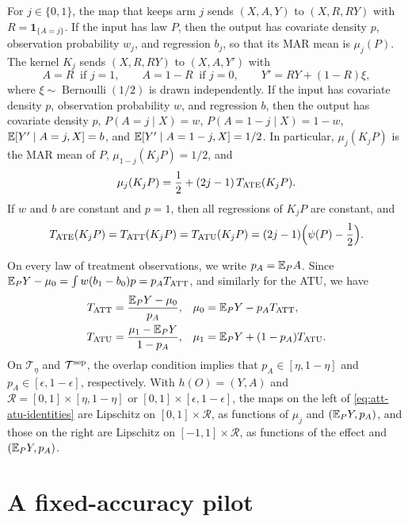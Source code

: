 For $j\in\{0,1\}$, the map that keeps arm $j$ sends $(X,A,Y)$ to
$(X,R,RY)$ with $R=\mathbf 1_{\{A=j\}}$. If the input has law $P$, then
the output has covariate density $p$, observation probability $w_j$,
and regression $b_j$, so that its MAR mean is $\mu_j(P)$. The
kernel $K_j$ sends $(X,R,RY)$ to $(X,A,Y')$ with
\[
 A=R\ \text{ if }j=1,\qquad A=1-R\ \text{ if }j=0,\qquad
 Y'=RY+(1-R)\xi,
\]
where $\xi\sim\operatorname{Bernoulli}(1/2)$ is drawn independently. If
the input has covariate density $p$, observation probability $w$, and
regression $b$, then the output has covariate density $p$,
$P(A=j\mid X)=w$, $P(A=1-j\mid X)=1-w$, $\mathbb E[Y'\mid A=j,X]=b$, and
$\mathbb E[Y'\mid A=1-j,X]=1/2$. In particular, $\mu_j(K_jP)$ is the MAR mean
of $P$, $\mu_{1-j}(K_jP)=1/2$, and
\begin{equation}\label{eq:kernel-ate}
 \mu_j(K_jP)=\frac12+(2j-1)\,T_{\rm ATE}(K_jP).
\end{equation}
If $w$ and $b$ are constant and $p=1$, then all regressions of
$K_jP$ are constant, and
\begin{equation}\label{eq:kernel-constant}
 T_{\rm ATE}(K_jP)=T_{\rm ATT}(K_jP)=T_{\rm ATU}(K_jP)
 =(2j-1)\Bigl(\psi(P)-\frac12\Bigr).
\end{equation}

On every law of treatment observations, we write $p_A=\mathbb E_PA$. Since
$\mathbb E_PY-\mu_0=\int w(b_1-b_0)p=p_AT_{\rm ATT}$, and similarly for the
ATU, we have
\begin{equation}\label{eq:att-atu-identities}
 \begin{aligned}
 T_{\rm ATT}&=\frac{\mathbb E_PY-\mu_0}{p_A},
 &\mu_0&=\mathbb E_PY-p_AT_{\rm ATT},\\
 T_{\rm ATU}&=\frac{\mu_1-\mathbb E_PY}{1-p_A},
 &\mu_1&=\mathbb E_PY+(1-p_A)T_{\rm ATU}.
 \end{aligned}
\end{equation}
On $\mathcal T_\eta$ and $\mathcal T^{\rm sep}$, the overlap condition
implies that $p_A\in[\eta,1-\eta]$ and $p_A\in[\epsilon,1-\epsilon]$,
respectively. With $h(O)=(Y,A)$ and $\mathcal R=[0,1]\times[\eta,1-\eta]$
or $[0,1]\times[\epsilon,1-\epsilon]$, the maps on the left of
\eqref{eq:att-atu-identities} are Lipschitz on $[0,1]\times\mathcal R$,
as functions of $\mu_j$ and $(\mathbb E_PY,p_A)$, and those on the right are
Lipschitz on $[-1,1]\times\mathcal R$, as functions of the effect and
$(\mathbb E_PY,p_A)$.

\section{A fixed-accuracy pilot}\label{sec:broad-inclusions}

